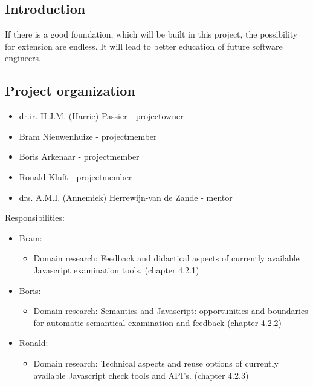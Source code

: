 \documentclass{article}
\begin{document}
\subsection{Introduction}

If there is a good foundation, which will be built in this project, the possibility for extension are endless. It will lead to better education of future software engineers.  

\subsection{Project organization}

\begin{itemize}
  \item dr.ir. H.J.M. (Harrie) Passier - projectowner
  \item Bram Nieuwenhuize - projectmember
  \item Boris Arkenaar - projectmember
  \item Ronald Kluft - projectmember
  \item drs. A.M.I. (Annemiek) Herrewijn-van de Zande - mentor
\end{itemize}

Responsibilities:
\begin{itemize}
  \item Bram: 
	\begin{itemize}
	\item Domain research: Feedback and didactical aspects of currently available Javascript examination tools. (chapter 4.2.1)
	\end{itemize}
  \item Boris:
	\begin{itemize}
	\item Domain research: Semantics and Javascript: opportunities and boundaries for automatic semantical examination and feedback (chapter 4.2.2)
	\end{itemize}
  \item Ronald:
	\begin{itemize}
	\item Domain research: Technical aspects and reuse options of currently available Javascript check tools and API's. (chapter 4.2.3)
	\end{itemize}
\end{itemize}
\end{document}
